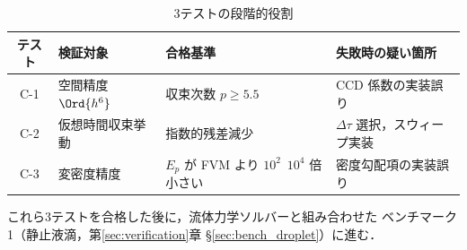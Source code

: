 \begin{table}[ht]
\centering
\caption{3テストの段階的役割}
\label{tab:three_tests_role}
\renewcommand{\arraystretch}{1.3}
\begin{tabular}{clll}
\hline
テスト & 検証対象 & 合格基準 & 失敗時の疑い箇所 \\
\hline
C-1 & 空間精度 $\Ord{h^6}$ & 収束次数 $p \ge 5.5$ & CCD 係数の実装誤り \\
C-2 & 仮想時間収束挙動 & 指数的残差減少 & $\Delta\tau$ 選択，スウィープ実装 \\
C-3 & 変密度精度 & $E_p$ が FVM より $10^2$~$10^4$ 倍小さい & 密度勾配項の実装誤り \\
\hline
\end{tabular}
\end{table}

これら3テストを合格した後に，流体力学ソルバーと組み合わせた
ベンチマーク1（静止液滴，第\ref{sec:verification}章 §\ref{sec:bench_droplet}）に進む．
